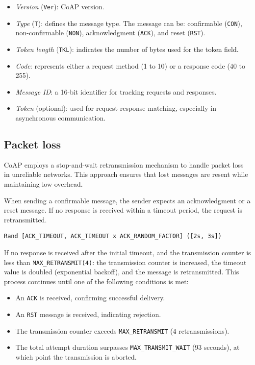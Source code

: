 \begin{itemize}
    \item \textit{Version} (\texttt{Ver}): CoAP version. 
    \item \textit{Type} (\texttt{T}): defines the message type. 
        The message can be: confirmable (\texttt{CON}), non-confirmable (\texttt{NON}), acknowledgment (\texttt{ACK}), and reset (\texttt{RST}).
    \item \textit{Token length} (\texttt{TKL}): indicates the number of bytes used for the token field.
    \item \textit{Code}: represents either a request method (1 to 10) or a response code (40 to 255).
    \item \textit{Message ID}: a 16-bit identifier for tracking requests and responses.
    \item \textit{Token} (optional): used for request-response matching, especially in asynchronous communication.
\end{itemize}

\subsection{Packet loss}
CoAP employs a stop-and-wait retransmission mechanism to handle packet loss in unreliable networks. 
This approach ensures that lost messages are resent while maintaining low overhead.

When sending a confirmable message, the sender expects an acknowledgment or a reset message. 
If no response is received within a timeout period, the request is retransmitted.
\begin{verbatim}
Rand [ACK_TIMEOUT, ACK_TIMEOUT x ACK_RANDOM_FACTOR] ([2s, 3s])
\end{verbatim}
If no response is received after the initial timeout, and the transmission counter is less than \texttt{MAX\_RETRANSMIT(4)}: the transmission counter is increased, the timeout value is doubled (exponential backoff), and the message is retransmitted.
This process continues until one of the following conditions is met:
\begin{itemize}
    \item An \texttt{ACK} is received, confirming successful delivery.
    \item An \texttt{RST} message is received, indicating rejection.
    \item The transmission counter exceeds \texttt{MAX\_RETRANSMIT} (4 retransmissions).
    \item The total attempt duration surpasses \texttt{MAX\_TRANSMIT\_WAIT} (93 seconds), at which point the transmission is aborted.
\end{itemize}


